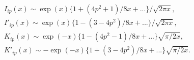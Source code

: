 \begin{equation}\label{smallp}\begin{array}{l} I_{ip}(x)\sim \exp(x)\{1+(4p^2+1)/8x+...\}/\sqrt{2\pi x},\\
I'_{ip}(x)\sim \exp(x)\{1-(3-4p^2)/8x+...\}/\sqrt{2\pi
x},\\K_{ip}(x)\sim
\exp(-x)\{1-(4p^2-1)/8x+...\}\sqrt{\pi/2x},\\K'_{ip}(x)\sim
-\exp(-x)\{1+(3-4p^2)/8x+...\}\sqrt{\pi/2x}.
\end{array}\end{equation}

